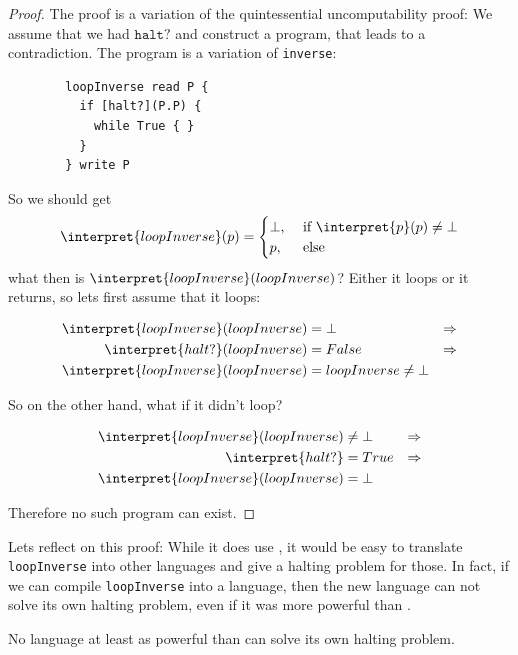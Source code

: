 \begin{proof}
	The proof is a variation of the quintessential uncomputability proof: We 
	assume that we had $\mathtt{halt?}$ and construct a program, that leads to a
	contradiction. The program is a variation of {\tt inverse}:

	\begin{verbatim}
		loopInverse read P {
		  if [halt?](P.P) {
		    while True { }
		  }
		} write P
	\end{verbatim}

	So we should get
	\begin{equation*}
	 \interpret{loopInverse}(p) = \begin{cases}
			\bot, &\text{ if }\interpret{p}(p) \neq \bot\\
			p,& \text{ else} 
		\end{cases}
	\end{equation*}
	what then is $\interpret{loopInverse}(loopInverse)$? Either it loops or it 
	returns, so lets first assume that it loops:

	\begin{align*}
		\interpret{loopInverse}(loopInverse) &= \bot &\Rightarrow \\ 
		\interpret{halt?}(loopInverse) &= False &\Rightarrow \\ 
		\interpret{loopInverse}(loopInverse) &= loopInverse\neq \bot
	\end{align*}

	So on the other hand, what if it didn't loop?

	\begin{align*}
		\interpret{loopInverse}(loopInverse) &\neq\bot &\Rightarrow \\
		\interpret{halt?} &= True & \Rightarrow \\
		\interpret{loopInverse}(loopInverse) &= \bot
	\end{align*}

	Therefore no such \WHILE program can exist.
\end{proof}

Lets reflect on this proof: While it does use \WHILE, it would be easy to 
translate {\tt loopInverse} into other languages and give a halting 
problem for those. In fact, if we can compile {\tt loopInverse} into a 
language, then the new language can not solve its own halting problem, even 
if it was more powerful than \WHILE.

\begin{corrolary}
	No language at least as powerful than \WHILE can solve its own halting problem.
\end{corrolary}

